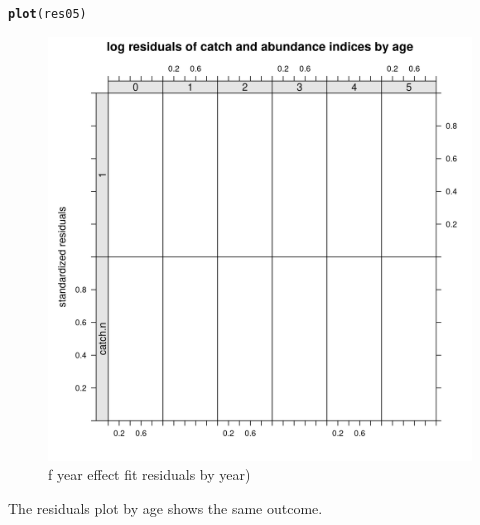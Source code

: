 \documentclass[a4paper,english,11pt]{article}\usepackage[]{graphicx}\usepackage[]{xcolor}
\makeatletter
\newcommand{\hldef}[1]{\textcolor[rgb]{0.345,0.345,0.345}{#1}}%
\newcommand{\hlkwd}[1]{\textcolor[rgb]{0.737,0.353,0.396}{\textbf{#1}}}%
\newenvironment{kframe}{%
 \def\at@end@of@kframe{}%
 \ifinner\ifhmode%
  \def\at@end@of@kframe{\end{minipage}}%
  \begin{minipage}{\columnwidth}%
 \fi\fi%
 \def\FrameCommand##1{\hskip\@totalleftmargin \hskip-\fboxsep
 \colorbox{shadecolor}{##1}\hskip-\fboxsep
     \hskip-\linewidth \hskip-\@totalleftmargin \hskip\columnwidth}%
 \MakeFramed {\advance\hsize-\width
   \@totalleftmargin\z@ \linewidth\hsize
   \@setminipage}}%
 {\par\unskip\endMakeFramed%
 \at@end@of@kframe}
\newenvironment{knitrout}{}{} %
\makeatother
\begin{document}
\begin{knitrout}
\color{fgcolor}\begin{kframe}
\begin{alltt}
\hlkwd{plot}\hldef{(res05)}
\end{alltt}
\end{kframe}\begin{figure}[H]

{\centering \includegraphics[width=.9\linewidth]{figure/fyearresbyyear-1} 

}

\caption[f year effect fit residuals by year)]{f year effect fit residuals by year)}\label{fig:fyearresbyyear}
\end{figure}

\end{knitrout}

The residuals plot by age shows the same outcome.  
\end{document}
